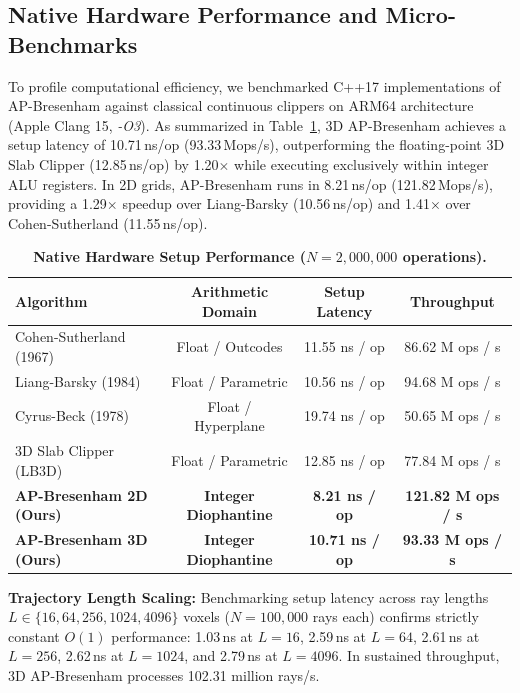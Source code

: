 \documentclass[journal=dme,manuscript=article,11pt]{article}
\begin{document}
\subsection{Native Hardware Performance and Micro-Benchmarks}
To profile computational efficiency, we benchmarked C++17 implementations of AP-Bresenham against classical continuous clippers on ARM64 architecture (Apple Clang 15, \textit{-O3}). As summarized in Table~\ref{tab:setup_latency}, 3D AP-Bresenham achieves a setup latency of 10.71\,ns/op (93.33\,Mops/s), outperforming the floating-point 3D Slab Clipper (12.85\,ns/op) by 1.20$\times$ while executing exclusively within integer ALU registers. In 2D grids, AP-Bresenham runs in 8.21\,ns/op (121.82\,Mops/s), providing a 1.29$\times$ speedup over Liang-Barsky (10.56\,ns/op) and 1.41$\times$ over Cohen-Sutherland (11.55\,ns/op).

\begin{table}[htbp]
\centering
\caption{\textbf{Native Hardware Setup Performance ($N = 2,000,000$ operations).}}
\label{tab:setup_latency}
\begin{tabular}{lccc}
\toprule
\textbf{Algorithm} & \textbf{Arithmetic Domain} & \textbf{Setup Latency} & \textbf{Throughput} \\
\midrule
Cohen-Sutherland (1967)\cite{cohen1967clipping} & Float / Outcodes & 11.55 ns / op & 86.62 M ops / s \\
Liang-Barsky (1984)\cite{liang1984new} & Float / Parametric & 10.56 ns / op & 94.68 M ops / s \\
Cyrus-Beck (1978)\cite{cyrus1978generalized} & Float / Hyperplane & 19.74 ns / op & 50.65 M ops / s \\
3D Slab Clipper (LB3D) & Float / Parametric & 12.85 ns / op & 77.84 M ops / s \\
\midrule
\textbf{AP-Bresenham 2D (Ours)} & \textbf{Integer Diophantine} & \textbf{8.21 ns / op} & \textbf{121.82 M ops / s} \\
\textbf{AP-Bresenham 3D (Ours)} & \textbf{Integer Diophantine} & \textbf{10.71 ns / op} & \textbf{93.33 M ops / s} \\
\bottomrule
\end{tabular}
\end{table}

\textbf{Trajectory Length Scaling:} Benchmarking setup latency across ray lengths $L \in \{16, 64, 256, 1024, 4096\}$ voxels ($N = 100,000$ rays each) confirms strictly constant $O(1)$ performance: 1.03\,ns at $L=16$, 2.59\,ns at $L=64$, 2.61\,ns at $L=256$, 2.62\,ns at $L=1024$, and 2.79\,ns at $L=4096$. In sustained throughput, 3D AP-Bresenham processes 102.31 million rays/s.
\end{document}
